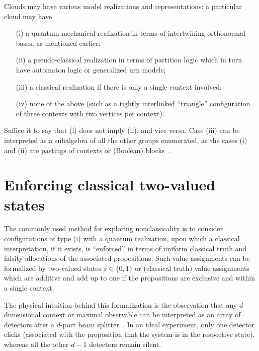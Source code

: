 \documentclass[%
  reprint,
  twocolumn,
 showpacs,
 showkeys,
 preprintnumbers,
 amsmath,amssymb,
 aps,
  prl,
  longbibliography,
 ]{revtex4-1}
\begin{document}
Clouds may have various model realizations and representations: a particular cloud may have
\begin{itemize}
\item[(i)] a quantum mechanical realization in terms of intertwining orthonormal bases, as mentioned earlier;
\item[(ii)] a pseudo-classical realization in terms of partition logic which in turn have automaton logic or generalized urn models;
\item[(iii)] a classical realization if there is only a single context involved;
\item[(iv)] none of the above (such as a tightly interlinked ``triangle'' configuration of three contexts with two vertices per context).
\end{itemize}
Suffice it to say that (i) does not imply (ii), and vice versa.
Case (iii) can be interpreted as
a subalgebra of all the other groups enumerated, as the cases (i) and (ii) are pastings of contexts or (Boolean) blocks~\cite{nav:91}.

\section{Enforcing classical two-valued states}

The commonly used method for exploring nonclassicality is to consider
configurations of type (i) with a quantum realization, upon which a classical interpretation, if it exists,
is ``enforced'' in terms of uniform classical truth and falsity allocations of the associated propositions.
Such value assignments
can be formalized by two-valued   states $s \in \{0,1\}$ or (classical truth) value assignments
which are additive and add up to one if the propositions are exclusive and within a single context.

The physical intuition behind this formalization is the observation that any $d$-dimensional context or maximal observable
can be interpreted as an array of detectors after a $d$-port beam splitter~\cite{rzbb}.
In an ideal experiment, only one detector clicks (associated with the proposition that the system is in the respective state),
whereas all the other $d-1$ detectors remain silent.
\end{document}
